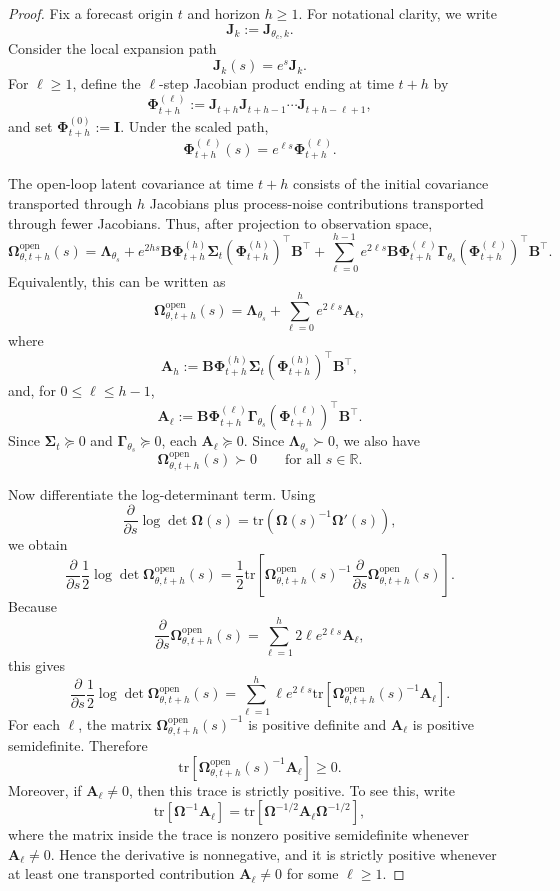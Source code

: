 \documentclass{article}
\theoremstyle{plain}
\theoremstyle{definition}
\theoremstyle{remark}
\newcommand{\tr}{\mathrm{tr}}
\begin{document}
\begin{proof}

Fix a forecast origin $t$ and horizon $h\ge1$. For notational clarity, we write
\[
\bm J_k:=\bm J_{\theta_c,k}.
\]
Consider the local expansion path
\[
\bm J_k(s)=e^s\bm J_k.
\]
For $\ell\ge1$, define the $\ell$-step Jacobian product ending at time $t+h$ by
\[
\bm\Phi^{(\ell)}_{t+h}:=\bm J_{t+h}\bm J_{t+h-1}\cdots \bm J_{t+h-\ell+1},
\]
and set $\bm\Phi^{(0)}_{t+h}:=\bm I$. Under the scaled path,
\[
\bm\Phi^{(\ell)}_{t+h}(s)
=
e^{\ell s}\bm\Phi^{(\ell)}_{t+h}.
\]

The open-loop latent covariance at time $t+h$ consists of the initial covariance
transported through $h$ Jacobians plus process-noise contributions transported
through fewer Jacobians. Thus, after projection to observation space,
\[
\bm\Omega^{\mathrm{open}}_{\theta,t+h}(s)
=
\bm\Lambda_{\theta_s}
+
e^{2hs}
\bm B\bm\Phi^{(h)}_{t+h}\bm\Sigma_t
(\bm\Phi^{(h)}_{t+h})^\top\bm B^\top
+
\sum_{\ell=0}^{h-1}
e^{2\ell s}
\bm B\bm\Phi^{(\ell)}_{t+h}
\bm\Gamma_{\theta_s}
(\bm\Phi^{(\ell)}_{t+h})^\top\bm B^\top .
\]
Equivalently, this can be written as
\[
\bm\Omega^{\mathrm{open}}_{\theta,t+h}(s)
=
\bm\Lambda_{\theta_s}
+
\sum_{\ell=0}^{h} e^{2\ell s}\bm A_\ell,
\]
where
\[
\bm A_h
:=
\bm B\bm\Phi^{(h)}_{t+h}\bm\Sigma_t
(\bm\Phi^{(h)}_{t+h})^\top\bm B^\top,
\]
and, for $0\le \ell\le h-1$,
\[
\bm A_\ell
:=
\bm B\bm\Phi^{(\ell)}_{t+h}
\bm\Gamma_{\theta_s}
(\bm\Phi^{(\ell)}_{t+h})^\top\bm B^\top .
\]
Since $\bm\Sigma_t\succeq0$ and $\bm\Gamma_{\theta_s}\succeq0$, each
$\bm A_\ell\succeq0$. Since $\bm\Lambda_{\theta_s}\succ0$, we also have
\[
\bm\Omega^{\mathrm{open}}_{\theta,t+h}(s)\succ0
\qquad
\text{for all }s\in\mathbb R.
\]

Now differentiate the log-determinant term. Using
\[
\frac{\partial}{\partial s}\log\det \bm\Omega(s)
=
\tr \left(\bm\Omega(s)^{-1}\bm\Omega'(s)\right),
\]
we obtain
\[
\frac{\partial}{\partial s}
\frac12\log\det\bm\Omega^{\mathrm{open}}_{\theta,t+h}(s)
=
\frac12
\tr \left[
\bm\Omega^{\mathrm{open}}_{\theta,t+h}(s)^{-1}
\frac{\partial}{\partial s}\bm\Omega^{\mathrm{open}}_{\theta,t+h}(s)
\right].
\]
Because
\[
\frac{\partial}{\partial s}\bm\Omega^{\mathrm{open}}_{\theta,t+h}(s)
=
\sum_{\ell=1}^{h}
2\ell e^{2\ell s}\bm A_\ell,
\]
this gives
\[
\frac{\partial}{\partial s}
\frac12\log\det\bm\Omega^{\mathrm{open}}_{\theta,t+h}(s)
=
\sum_{\ell=1}^{h}
\ell e^{2\ell s}
\tr \left[
\bm\Omega^{\mathrm{open}}_{\theta,t+h}(s)^{-1}
\bm A_\ell
\right].
\]
For each $\ell$, the matrix
$\bm\Omega^{\mathrm{open}}_{\theta,t+h}(s)^{-1}$ is positive definite and
$\bm A_\ell$ is positive semidefinite. Therefore
\[
\tr \left[
\bm\Omega^{\mathrm{open}}_{\theta,t+h}(s)^{-1}
\bm A_\ell
\right]\ge0.
\]
Moreover, if $\bm A_\ell\neq0$, then this trace is strictly positive. To see
this, write
\[
\tr \left[
\bm\Omega^{-1}\bm A_\ell
\right]
=
\tr \left[
\bm\Omega^{-1/2}\bm A_\ell\bm\Omega^{-1/2}
\right],
\]
where the matrix inside the trace is nonzero positive semidefinite whenever
$\bm A_\ell\neq0$. Hence the derivative is nonnegative, and it is strictly
positive whenever at least one transported contribution $\bm A_\ell\neq0$ for
some $\ell\ge1$.


\end{proof}
\end{document}
